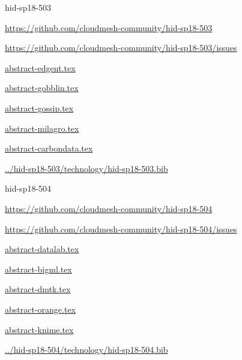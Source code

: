\begin{IU}

hid-sp18-503

\url{https://github.com/cloudmesh-community/hid-sp18-503}

\url{https://github.com/cloudmesh-community/hid-sp18-503/issues}

\href{https://github.com/cloudmesh-community/hid-sp18-503/blob/master//technology/abstract-edgent.tex}{abstract-edgent.tex}

\href{https://github.com/cloudmesh-community/hid-sp18-503/blob/master//technology/abstract-gobblin.tex}{abstract-gobblin.tex}

\href{https://github.com/cloudmesh-community/hid-sp18-503/blob/master//technology/abstract-gossip.tex}{abstract-gossip.tex}

\href{https://github.com/cloudmesh-community/hid-sp18-503/blob/master//technology/abstract-milagro.tex}{abstract-milagro.tex}

\href{https://github.com/cloudmesh-community/hid-sp18-503/blob/master//technology/abstract-carbondata.tex}{abstract-carbondata.tex}

\href{https://github.com/cloudmesh-community/hid-sp18-503/blob/master//technology/hid-sp18-503.bib}{../hid-sp18-503/technology/hid-sp18-503.bib}

\end{IU}


\begin{IU}

hid-sp18-504

\url{https://github.com/cloudmesh-community/hid-sp18-504}

\url{https://github.com/cloudmesh-community/hid-sp18-504/issues}

\href{https://github.com/cloudmesh-community/hid-sp18-504/blob/master//technology/abstract-datalab.tex}{abstract-datalab.tex}

\href{https://github.com/cloudmesh-community/hid-sp18-504/blob/master//technology/abstract-bigml.tex}{abstract-bigml.tex}

\href{https://github.com/cloudmesh-community/hid-sp18-504/blob/master//technology/abstract-dmtk.tex}{abstract-dmtk.tex}

\href{https://github.com/cloudmesh-community/hid-sp18-504/blob/master//technology/abstract-orange.tex}{abstract-orange.tex}

\href{https://github.com/cloudmesh-community/hid-sp18-504/blob/master//technology/abstract-knime.tex}{abstract-knime.tex}

\href{https://github.com/cloudmesh-community/hid-sp18-504/blob/master//technology/hid-sp18-504.bib}{../hid-sp18-504/technology/hid-sp18-504.bib}

\end{IU}


